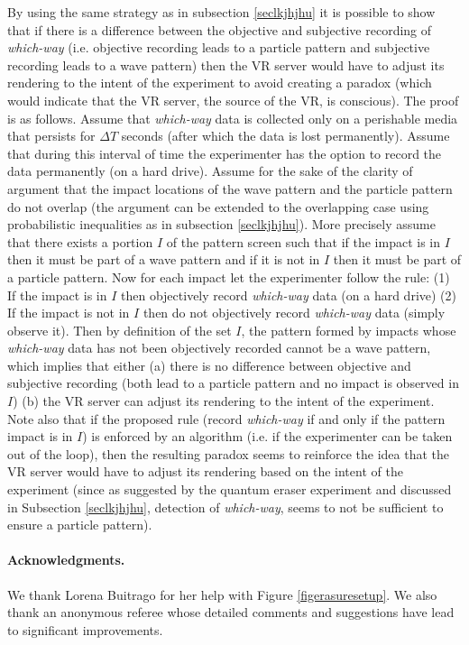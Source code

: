 \documentclass[11pt]{article}
\theoremstyle{definition}
\begin{document}
By using the same strategy as in subsection \ref{seclkjhjhu} it is possible to show that if there is a difference between the objective and subjective recording of \emph{which-way} (i.e. objective recording leads to a particle pattern and subjective recording leads to a wave pattern) then the VR server would have to adjust its rendering to the intent of the experiment to avoid creating a paradox
(which would indicate that the VR server, the source of the VR,  is conscious).
The proof is as follows. Assume that \emph{which-way} data is collected only on a perishable media that persists for $\Delta T$ seconds (after which the data is lost permanently). Assume that during this interval of time the experimenter has the option to record the data permanently (on a hard drive).
Assume for the sake of the clarity of argument that the impact locations of the wave pattern and the particle pattern do not overlap (the argument can be extended to the overlapping case using  probabilistic inequalities as in subsection \ref{seclkjhjhu}). More precisely assume that there exists a portion $I$ of the pattern screen such that if the impact is in $I$ then it must be part of a wave pattern and if it is not in $I$ then it must be part of a particle pattern.
Now for each impact let the experimenter  follow the rule: (1)
If the impact is in $I$ then objectively record \emph{which-way}  data (on a hard drive)
(2) If the impact is not in $I$ then do not objectively record \emph{which-way}  data (simply observe it).
Then by  definition of the set $I$, the pattern formed by impacts whose \emph{which-way} data has not been objectively recorded cannot be a wave pattern, which implies that either (a) there is no difference between objective and subjective recording (both lead to a particle pattern and no impact is observed in $I$) (b) the VR server can adjust its rendering to the intent of the experiment.
Note also that if the proposed rule (record  \emph{which-way} if and only if the pattern impact is in $I$) is  enforced by an algorithm (i.e. if the experimenter can be taken out of the loop), then the resulting paradox seems to reinforce the idea that the VR server would have to adjust its rendering based on the intent of the experiment (since as suggested by the quantum eraser experiment and discussed in Subsection \ref{seclkjhjhu}, detection of \emph{which-way}, seems to not be sufficient to ensure a particle pattern).






\paragraph{Acknowledgments.} We thank Lorena Buitrago for her help with Figure \ref{figerasuresetup}. We also thank an anonymous referee whose detailed comments and suggestions have lead to significant improvements.









\end{document}
